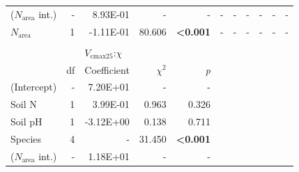 \begin{landscape}
\begin{table}
{\begin{tabular}{p{2.5cm}p{0.5cm}p{2cm}p{1.5cm}p{1.5cm}p{2cm}p{1.5cm}p{1.5cm}p{2cm}p{1.5cm}p{1.5cm}}
        ($N_\mathrm{area}$ int.) & \multicolumn{1}{r}{-}
        & \multicolumn{1}{r}{8.93E-01}  & \multicolumn{1}{r}{-}    & \multicolumn{1}{r}{-}
        & \multicolumn{1}{r}{-}         & \multicolumn{1}{r}{-}    & \multicolumn{1}{r}{-}
        & \multicolumn{1}{r}{-}         & \multicolumn{1}{r}{-}    & \multicolumn{1}{r}{-}
        \\

        $N_\mathrm{area}$ & \multicolumn{1}{r}{1}
        & \multicolumn{1}{r}{-1.11E-01} & \multicolumn{1}{r}{80.606}  & \multicolumn{1}{r}{\textbf{<0.001}}
        & \multicolumn{1}{r}{-}         & \multicolumn{1}{r}{-}       & \multicolumn{1}{r}{-}
        & \multicolumn{1}{r}{-}         & \multicolumn{1}{r}{-}       & \multicolumn{1}{r}{-}
        \\
        \hline

        &&&&&&&&&&
        \\

        && \multicolumn{3}{l}{$V_{\mathrm{cmax25}}$:$\chi$} &&&&& \\
        \hline
        & \multicolumn{1}{r}{df}
        & \multicolumn{1}{r}{Coefficient} & \multicolumn{1}{r}{$\chi^{2}$} & \multicolumn{1}{r}{\textit{p}} 
        \\
        \hline

        (Intercept) & \multicolumn{1}{r}{-}
        & \multicolumn{1}{r}{7.20E+01} & \multicolumn{1}{r}{-} & \multicolumn{1}{r}{-}
        &&&&&&
        \\

        Soil N & \multicolumn{1}{r}{1}
        & \multicolumn{1}{r}{3.99E-01}  & \multicolumn{1}{r}{0.963} & \multicolumn{1}{r}{0.326}
        &&&&&& 
        \\

        Soil pH & \multicolumn{1}{r}{1}
        & \multicolumn{1}{r}{-3.12E+00} & \multicolumn{1}{r}{0.138} & \multicolumn{1}{r}{0.711}
        &&&&&& 
        \\

        Species & \multicolumn{1}{r}{4}
        & \multicolumn{1}{r}{-} & \multicolumn{1}{r}{31.450} & \multicolumn{1}{r}{\textbf{<0.001}}
        \\
        \hline

        ($N_\mathrm{area}$ int.) & \multicolumn{1}{r}{-}
        & \multicolumn{1}{r}{1.18E+01} & \multicolumn{1}{r}{-} & \multicolumn{1}{r}{-}
        &&&&&& 
        \\


\end{tabular}}
\end{table}
\end{landscape}
